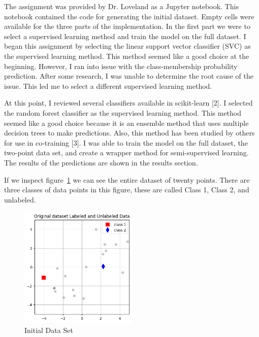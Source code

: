 The assignment was provided by Dr. Loveland as a Jupyter notebook. This notebook contained the code for generating the initial dataset. Empty cells were available for the three parts of the implementation.
In the first part we were to select a supervised learning method and train the model on the full dataset. I began this assignment by selecting the linear support vector classifier (SVC) as the supervised learning method. This method seemed like a good choice at the beginning. 
However, I ran into issue with the class-membership probability prediction. After some research, I was unable to determine the root cause of the issue. This led me to select a different supervised learning method.\par
At this point, I reviewed several classifiers available in scikit-learn [2]. I selected the random forest classifier as the supervised learning method. This method seemed like a good choice because it is an ensemble method that uses multiple decision trees to make predictions. 
Also, this method has been studied by others for use in co-training [3]. I was able to train the model on the full dataset, the two-point data set, and create a wrapper method for semi-supervised learning. The results of the predictions are shown in the results section.\par
If we inspect figure~\ref{fig:img0} we can see the entire dataset of twenty points. There are three classes of data points in this figure, these are called Class 1, Class 2, and unlabeled.

\begin{figure}[H]
    \centering
    \includegraphics[width=0.5\textwidth]{images/img0.png}
    \caption{Initial Data Set}
    \label{fig:img0}
\end{figure}


